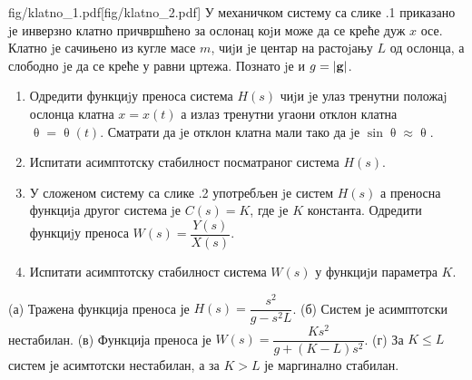 \begin{slikaDesno}{fig/klatno_1.pdf}[fig/klatno_2.pdf]
    \PID 
    У механичком систему са слике \ID.1 приказано jе инверзно клатно причвршћено
    за ослонац коjи може да се креће дуж $x$ осе. Клатно jе сачињено из кугле масе
    $m$, чиjи jе центар на растоjању $L$ од ослонца, а слободно jе да се креће у равни
    цртежа. Познато jе и $g = |{\bf g}|$.
    \begin{enumerate}[label=(\alph*)]
        \item Одредити функциjу преноса система $H(s)$ чиjи jе улаз тренутни положаj
              ослонца клатна $x = x(t)$ а излаз тренутни угаони отклон клатна 
              $\uptheta = \uptheta(t)$. Сматрати да jе отклон клатна мали тако да jе $\sin \uptheta \approx \uptheta$.
        \item Испитати асимптотску стабилност посматраног система $H(s)$.
        \item У сложеном систему са слике \ID.2 употребљен jе систем $H(s)$ а преносна функциjа другог система jе 
        $C(s) = K$, где jе $K$ константа. Одредити функциjу
        преноса $W(s) = \dfrac{Y(s)}{X(s)}$.
        \item Испитати асимптотску стабилност система $W(s)$ у функциjи параметра $K$.
    \end{enumerate}
\end{slikaDesno}

\REZULTAT

(а) Тражена функција преноса је $H(s) = \dfrac{s^2}{ g - s^2 L}$. (б) Систем је асимптотски нестабилан. 
(в) Функција преноса је $W(s) = \dfrac{K s^2}{g + (K - L) s^2}$.
(г) За $K \leq L$ систем је асимтотски нестабилан, а за $K > L$ је маргинално стабилан. 